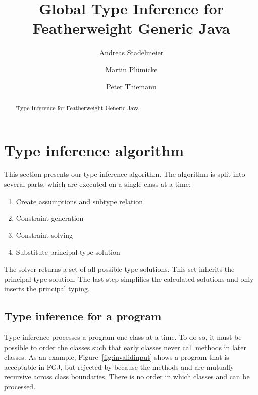 \documentclass[a4paper,USenglish,cleveref, autoref, thm-restate]{lipics-v2021}
\title{Global Type Inference for Featherweight Generic Java} %
\author{Andreas Stadelmeier}{DHBW Stuttgart, Campus Horb, Germany}{a.stadelmeier@hb.dhbw-stuttgart.de}{}{}%
\author{Martin Plümicke}{DHBW Stuttgart, Campus Horb, Germany}{pl@dhbw.de}{}{}
\author{Peter Thiemann}{Universität Freiburg, Institut für Informatik, Germany}{thiemann@informatik.uni-freiburg.de}{}{}
\begin{document}
\maketitle

\begin{abstract}
  Type Inference for Featherweight Generic Java
\end{abstract}









\section{Type inference algorithm}
\label{sec:type-infer-algor}
This section presents our type inference algorithm.
The algorithm is split into several parts, which are executed on a single class at a time:

\begin{enumerate}
\item Create assumptions and subtype relation
\item Constraint generation %
\item Constraint solving %
\item Substitute principal type solution
\end{enumerate}

The solver returns a set of all possible type solutions.
This set inherits the principal type solution.
The last step simplifies the calculated solutions and only inserts the principal typing.

\subsection{Type inference for a program}
\label{sec:proc-mult-class}

Type inference processes a program one class at a time.
To do so, it must be possible to order the classes such that early
classes never call methods in later classes.
As an example, Figure~\ref{fig:invalidinput} shows a program that is
acceptable in FGJ, but rejected by \TFGJ because the methods 
and  are mutually recursive across class boundaries. There is
no order in which classes  and  can be processed.
\end{document}
